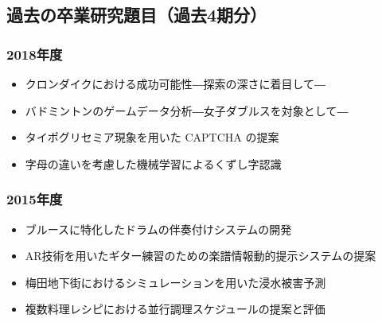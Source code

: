 \documentclass[a4paper,uplatex,dvipdfm]{bxjsarticle}
\begin{document}
\subsection*{過去の卒業研究題目（過去4期分）}
\begin{minipage}[t]{.47\textwidth}
{\footnotesize
\subsubsection*{2018年度}
\begin{itemize}
  \item クロンダイクにおける成功可能性―探索の深さに着目して―
  \item バドミントンのゲームデータ分析―女子ダブルスを対象として―
  \item タイポグリセミア現象を用いた CAPTCHA の提案
  \item 字母の違いを考慮した機械学習によるくずし字認識
\end{itemize}
\subsubsection*{2015年度}
\begin{itemize}
  \item ブルースに特化したドラムの伴奏付けシステムの開発
  \item AR技術を用いたギター練習のための楽譜情報動的提示システムの提案
  \item 梅田地下街におけるシミュレーションを用いた浸水被害予測
  \item 複数料理レシピにおける並行調理スケジュールの提案と評価
\end{itemize}
}
\end{minipage}
\hspace{.03\textwidth}
\end{document}
